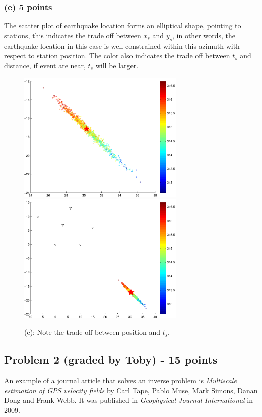 \documentclass[11pt]{article}
\begin{document}
\subsubsection*{(e) 5 points}
 The scatter plot of earthquake location forms an elliptical shape, pointing to stations, this indicates the trade off between $x_s$ and $y_s$, in other words, the earthquake location in this case is well constrained within this azimuth with respect to station position. The color also indicates the trade off between $t_s$ and distance, if event are near, $t_s$ will be larger.
\begin{figure}
  \includegraphics[width=8cm]{fig01.pdf}
  \includegraphics[width=8cm]{fig02.pdf}
  \caption{(e): Note the trade off between position and $t_s$. }
\end{figure}
\begin{figure}
\end{figure}

\newpage

\subsection*{Problem 2 (graded by Toby) - 15 points}
An example of a journal article that solves an inverse problem is \textit{Multiscale estimation of GPS velocity fields} by Carl Tape, Pablo Muse, Mark Simons, Danan Dong and Frank Webb. It was published in \textit{Geophysical Journal International} in 2009.
\end{document}
